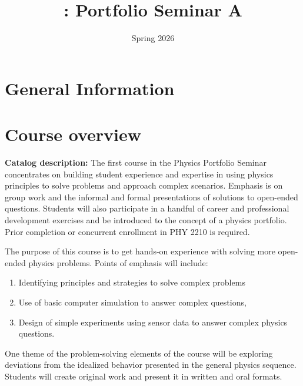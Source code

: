 \documentclass{syllabus}
\begin{document}
\thispagestyle{fancy}
\date{Spring 2026}
\author{}
\title{\coursecode: {Portfolio Seminar A}}
\maketitle



\section*{General Information}

\infotableport





\section*{Course overview}

\textbf{Catalog description:} The first course in the Physics Portfolio Seminar concentrates on building student experience and expertise in using physics principles to solve problems and approach complex scenarios. Emphasis is on group work and the informal and formal presentations of solutions to open-ended questions. Students will also participate in a handful of career and professional development exercises and be introduced to the concept of a physics portfolio. Prior completion or concurrent enrollment in PHY 2210 is required.

The purpose of this course is to get hands-on experience with solving more open-ended physics problems. Points of emphasis will include:
\begin{enumerate}
    \item Identifying principles and strategies to solve complex problems
    \item Use of basic computer simulation to answer complex questions,
    \item Design of simple experiments using sensor data to answer complex physics questions.
\end{enumerate}

One theme of the problem-solving elements of the course will be exploring deviations from the idealized behavior presented in the general physics sequence. Students will create original work and present it in written and oral formats.
\end{document}
